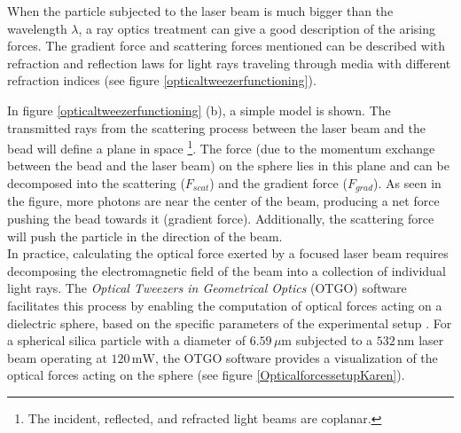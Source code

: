 \documentclass[letterpaper,12pt,oneside]{book}
\begin{document}
\noindent When the particle subjected to the laser beam is much bigger than the wavelength $\lambda$, a ray optics treatment can give a good description of the arising forces. The gradient force and scattering forces mentioned can be described with refraction and reflection laws for light rays traveling through media with different refraction indices (see figure \ref{opticaltweezerfunctioning}).

\noindent In figure \ref{opticaltweezerfunctioning} (b), a simple model is shown. The transmitted rays from the scattering process between the laser beam and the bead will define a plane in space \footnote{The incident, reflected, and refracted light beams are coplanar.}. The force (due to the momentum exchange between the bead and the laser beam) on the sphere lies in this plane and can be decomposed into the scattering ($F_{scat}$) and the gradient force ($F_{grad}$). As seen in the figure, more photons are near the center of the beam, producing a net force pushing the bead towards it (gradient force). Additionally, the scattering force will push the particle in the direction of the beam.\\ \noindent
In practice, calculating the optical force exerted by a focused laser beam requires decomposing the electromagnetic field of the beam into a collection of individual light rays. The \textit{Optical Tweezers in Geometrical Optics} (OTGO) software facilitates this process by enabling the computation of optical forces acting on a dielectric sphere, based on the specific parameters of the experimental setup \cite{callegari2015computational}. 
For a spherical silica particle with a diameter of \(6.59 \, \mu\text{m}\) subjected to a \(532 \, \text{nm}\) laser beam operating at \(120 \, \text{mW}\), the OTGO software provides a visualization of the optical forces acting on the sphere (see figure \ref{OpticalforcessetupKaren}).
\end{document}
